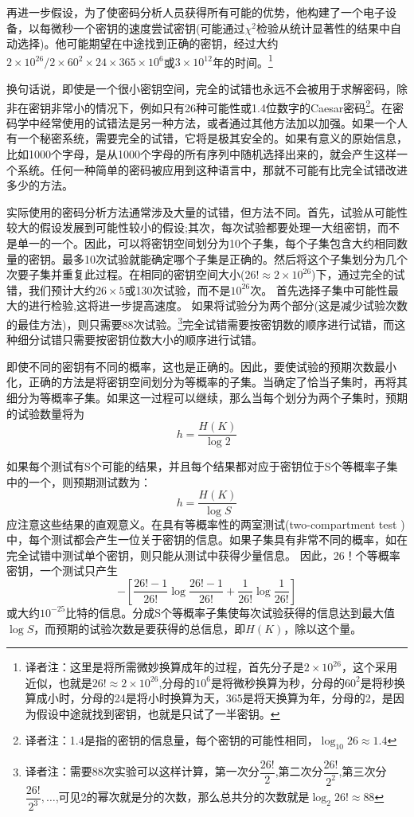 \documentclass[]{article}
\begin{document}
再进一步假设，为了使密码分析人员获得所有可能的优势，他构建了一个电子设备，以每微秒一个密钥的速度尝试密钥(可能通过$\chi^2$检验从统计显著性的结果中自动选择)。他可能期望在中途找到正确的密钥，经过大约$2\times 10^{26}/2\times 60^2\times 24\times 365\times 10^6$或$3\times 10^{12}$年的时间。\footnote{译者注：这里是将所需微妙换算成年的过程，首先分子是$2\times 10^{26}$，这个采用近似，也就是$26!\approx 2\times 10^{26}$,分母的$10^6$是将微秒换算为秒，分母的$60^2$是将秒换算成小时，分母的24是将小时换算为天，365是将天换算为年，分母的2，是因为假设中途就找到密钥，也就是只试了一半密钥。}

换句话说，即使是一个很小密钥空间，完全的试错也永远不会被用于求解密码，除非在密钥非常小的情况下，例如只有26种可能性或1.4位数字的Caesar密码\footnote{译者注：1.4是指的密钥的信息量，每个密钥的可能性相同，$\log_{10}{26}\approx 1.4$}。在密码学中经常使用的试错法是另一种方法，或者通过其他方法加以加强。如果一个人有一个秘密系统，需要完全的试错，它将是极其安全的。如果有意义的原始信息，比如1000个字母，是从1000个字母的所有序列中随机选择出来的，就会产生这样一个系统。任何一种简单的密码被应用到这种语言中，那就不可能有比完全试错改进多少的方法。

实际使用的密码分析方法通常涉及大量的试错，但方法不同。首先，试验从可能性较大的假设发展到可能性较小的假设;其次，每次试验都要处理一大组密钥，而不是单一的一个。因此，可以将密钥空间划分为10个子集，每个子集包含大约相同数量的密钥。最多10次试验就能确定哪个子集是正确的。然后将这个子集划分为几个次要子集并重复此过程。在相同的密钥空间大小($26!\approx 2\times 10^{26}$)下，通过完全的试错，我们预计大约$26\times 5$或130次试验，而不是$10^{26}$次。
首先选择子集中可能性最大的进行检验,这将进一步提高速度。
如果将试验分为两个部分(这是减少试验次数的最佳方法)，则只需要88次试验。\footnote{译者注：需要88次实验可以这样计算，第一次分$\dfrac{26!}{2}$,第二次分$\dfrac{26!}{2^2}$,第三次分$\dfrac{26!}{2^3},\ldots$,可见2的幂次就是分的次数，那么总共分的次数就是$\log_2{26!}\approx 88$}完全试错需要按密钥数的顺序进行试错，而这种细分试错只需要按密钥位数大小的顺序进行试错。

即使不同的密钥有不同的概率，这也是正确的。因此，要使试验的预期次数最小化，正确的方法是将密钥空间划分为等概率的子集。当确定了恰当子集时，再将其细分为等概率子集。如果这一过程可以继续，那么当每个划分为两个子集时，预期的试验数量将为
\[h=\dfrac{H(K)}{\log{2}}\]

如果每个测试有S个可能的结果，并且每个结果都对应于密钥位于S个等概率子集中的一个，则预期测试数为：
\[h=\dfrac{H(K)}{\log{S}}\]
应注意这些结果的直观意义。在具有等概率性的两室测试(two-compartment test )中，每个测试都会产生一位关于密钥的信息。如果子集具有非常不同的概率，如在完全试错中测试单个密钥，则只能从测试中获得少量信息。
因此，26！个等概率密钥，一个测试只产生
\[-\left[\dfrac{26!-1}{26!} \log{\dfrac{26!-1}{26!}}+\dfrac{1}{26!}\log{\dfrac{1}{26!}}\right]\]
或大约$10^{-25}$比特的信息。分成S个等概率子集使每次试验获得的信息达到最大值$\log{S}$，而预期的试验次数是要获得的总信息，即$H(K)$，除以这个量。
\end{document}
